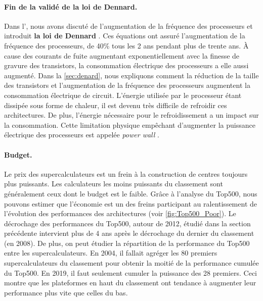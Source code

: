         \paragraph{Fin de la validé de la loi de Dennard.} 
                
            Dans l', nous avons discuté de l'augmentation de la fréquence des processeurs et introduit \textbf{la loi de Dennard} \cite{Dennard1974}. Ces équations ont assuré l'augmentation de la fréquence des processeurs, de 40\% tous les 2 ans pendant plus de trente ans. À cause des courants de fuite \cite{Wulf1995} augmentant exponentiellement avec la finesse de gravure des transistors, la consommation électrique des processeurs a elle aussi augmenté. Dans la \autoref{sec:denard}, nous expliquons comment la réduction de la taille des transistors et l'augmentation de la fréquence des processeurs augmentent la consommation électrique de circuit. L'énergie utilisée par le processeur étant dissipée sous forme de chaleur, il est devenu très difficile de refroidir ces architectures. De plus, l'énergie nécessaire pour le refroidissement a un impact sur la consommation. Cette limitation physique empêchant d'augmenter la puissance électrique des processeurs est appelée \textit{power wall} \cite{Kuroda2001}.

        \paragraph{Budget.} 
            
            Le prix des supercalculateurs est un frein à la construction de centres toujours plus puissants. Les calculateurs les moins puissants du classement sont généralement ceux dont le budget est le faible. Grâce à l'analyse du Top500, nous pouvons estimer que l'économie est un des freins participant au ralentissement de l'évolution des performances des architectures (voir \autoref{fig:Top500_Poor}). Le décrochage des performances du Top500, autour de 2012, étudié dans la section précédente intervient plus de 4 ans après le décrochage du dernier du classement (en 2008). De plus, on peut étudier la répartition de la performance du Top500 entre les supercalculateurs. En 2004, il fallait agréger les 80 premiers supercalculateurs du classement pour obtenir la moitié de la performance cumulée du Top500. En 2019, il faut seulement cumuler la puissance des 28 premiers. Ceci montre que les plateformes en haut du classement ont tendance à augmenter leur performance plus vite que celles du bas.
            
